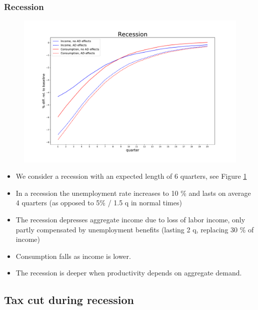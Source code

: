 \documentclass[]{article}
\begin{document}
\FloatBarrier
\subsubsection{Recession}

\begin{figure}
	\centering
	\includegraphics[width=\linewidth]{../full_run/recession}
	\caption{}
	\label{fig:recession}
\end{figure}


\begin{itemize}
	\item We consider a recession with an expected length of 6 quarters, see Figure \ref{fig:recession}
	\item In a recession the unemployment rate increases to 10 \% and lasts on average 4 quarters (as opposed to 5\% / 1.5 q in normal times)
	\item The recession depresses aggregate income due to loss of labor income, only partly compensated by unemployment benefits (lasting 2 q, replacing 30 \% of income)
	\item Consumption falls as income is lower.
	\item The recession is deeper when productivity depends on aggregate demand.
\end{itemize}




\FloatBarrier
\subsection{Tax cut during recession}
\end{document}
